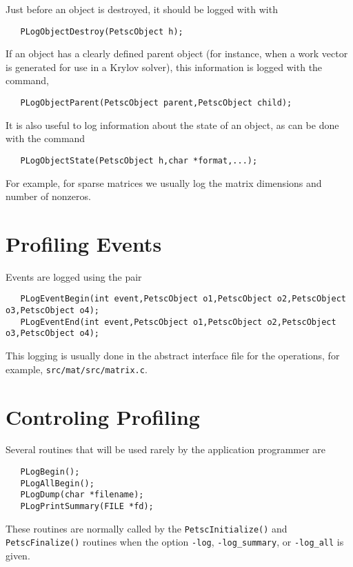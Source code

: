 Just before an object is destroyed, it should be  logged with
with  
\begin{verbatim}
   PLogObjectDestroy(PetscObject h);
\end{verbatim}

If an object has a clearly defined parent object (for instance, when 
a work vector is generated for use in a Krylov solver), this information
is logged with the command, 
\begin{verbatim}
   PLogObjectParent(PetscObject parent,PetscObject child);
\end{verbatim}
It is also useful to log information about the state of an object, as can
be done with the command 
\begin{verbatim}
   PLogObjectState(PetscObject h,char *format,...);
\end{verbatim}
For example, for sparse matrices we usually log the matrix 
dimensions and number of nonzeros.

\section{Profiling Events}

Events are logged using the 
pair 
\begin{verbatim}
   PLogEventBegin(int event,PetscObject o1,PetscObject o2,PetscObject o3,PetscObject o4);
   PLogEventEnd(int event,PetscObject o1,PetscObject o2,PetscObject o3,PetscObject o4);
\end{verbatim}
This logging is usually done in the abstract
interface file for the operations, for example, {\tt src/mat/src/matrix.c}.

\section{Controling Profiling}

Several routines that will be used rarely by the 
application programmer 
are    
\begin{verbatim}
   PLogBegin();
   PLogAllBegin();
   PLogDump(char *filename);
   PLogPrintSummary(FILE *fd);
\end{verbatim}
These routines are normally called by the {\tt PetscInitialize()}
and {\tt PetscFinalize()} routines when the option {\tt -log}, 
{\tt -log\_summary}, or 
{\tt -log\_all} is given.


